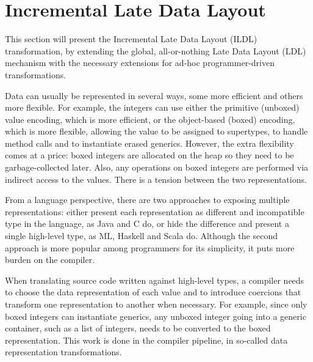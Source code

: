 \section{Incremental Late Data Layout}
\label{sec:ildl}

This section will present the Incremental Late Data Layout (ILDL) transformation, by extending the global, all-or-nothing Late Data Layout (LDL) mechanism with the necessary extensions for ad-hoc programmer-driven transformations.


Data can usually be represented in several ways, some more efficient and others more flexible. For example, the integers can use either the primitive (unboxed) value encoding, which is more efficient, or the object-based (boxed) encoding, which is more flexible, allowing the value to be assigned to supertypes, to handle method calls and to instantiate erased generics. However, the extra flexibility comes at a price: boxed integers are allocated on the heap so they need to be garbage-collected later. Also, any operations on boxed integers are performed via indirect access to the values. There is a tension between the two representations.

From a language perspective, there are two approaches to exposing multiple representations: either present each representation as different and incompatible type in the language, as Java and C do, or hide the difference and present a single high-level type, as ML, Haskell and Scala do. Although the second approach is more popular among programmers for its simplicity, it puts more burden on the compiler.

When translating source code written against high-level types, a compiler needs to choose the data representation of each value and to introduce coercions that transform one representation to another when necessary. For example, since only boxed integers can instantiate generics, any unboxed integer going into a generic container, such as a list of integers, needs to be converted to the boxed representation. This work is done in the compiler pipeline, in so-called data representation transformations.

